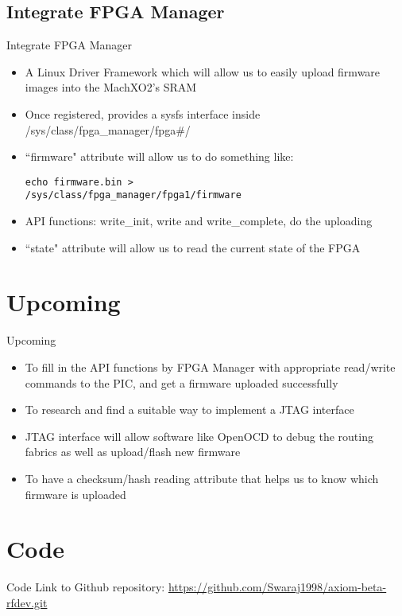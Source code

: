 \documentclass{beamer}
\begin{document}
\subsection{Integrate FPGA Manager}

\begin{frame}[fragile]{Integrate FPGA Manager}
\begin{itemize}
\item A Linux Driver Framework which will allow us to easily upload firmware
	images into the MachXO2's SRAM
\item Once registered, provides a sysfs interface inside /sys/class/fpga\_manager/fpga\#/
\item ``firmware" attribute will allow us to do something like:
\begin{verbatim}
echo firmware.bin >
/sys/class/fpga_manager/fpga1/firmware
\end{verbatim}
\item API functions: write\_init, write and write\_complete, do the uploading
\item ``state" attribute will allow us to read the current state of the FPGA 
\end{itemize}
\end{frame}

\section{Upcoming}

\begin{frame}{Upcoming}
\begin{itemize}
\item To fill in the API functions by FPGA Manager with appropriate read/write
	commands to the PIC, and get a firmware uploaded successfully
\item To research and find a suitable way to implement a JTAG interface
\item JTAG interface will allow software like OpenOCD to debug the routing fabrics
	as well as upload/flash new firmware
\item To have a checksum/hash reading attribute that helps us to know which firmware
	is uploaded
\end{itemize}
\end{frame}

\section{Code}

\begin{frame}{Code}
Link to Github repository:
\url{https://github.com/Swaraj1998/axiom-beta-rfdev.git}
\end{frame}
\end{document}
